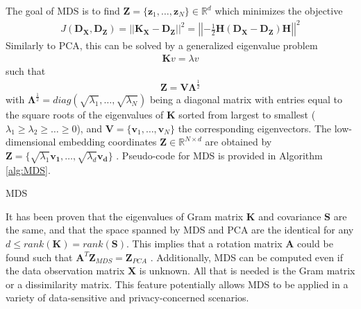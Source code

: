 The goal of MDS is to find $\bm{Z}= \{\bm{z}_{1}, \dots, \bm{z}_{N}\} \in \mathbb{R}^{d}$ which minimizes the objective 
\begin{align}
	J(\bm{D}_{\bm{X}},\bm{D}_{\bm{Z}}) = ||\bm{K}_{\bm{X}} - \bm{D}_{\bm{Z}} ||^{2} = \left |\left|-\frac{1}{2} \bm{H} (\bm{D}_{\bm{X}} - \bm{D}_{\bm{Z}}) \bm{H} \right |\right|^{2}
\end{align}
Similarly to PCA, this can be solved by a generalized eigenvalue problem 
\begin{align} \label{eq:MDS_eig}
	\bm{K}v = \lambda v
\end{align}
\noindent
such that 
\begin{align}
	\bm{Z} = \bm{V}\bm{\Lambda}^{\frac{1}{2}}
\end{align}
\noindent
with $\bm{\Lambda}^{\frac{1}{2}} = diag(\sqrt{\lambda_{1}},\dots,\sqrt{\lambda_N})$ being a diagonal matrix with entries equal to the square roots of the eigenvalues of $\bm{K}$ sorted from largest to smallest ($\lambda_{1} \geq  \lambda_{2} \geq \dots \geq 0$), and $\bm{V} = \{ \bm{v}_{1}, \dots, \bm{v}_{N} \}$ the corresponding eigenvectors.  The low-dimensional embedding coordinates $\bm{Z} \in \mathbb{R}^{N \times d}$ are obtained by $\bm{Z} = \{\sqrt{\lambda_{1}}\bm{v_{1}}, \dots, \sqrt{\lambda_{d}}\bm{v_{d}} \}$ \citep{Chao2019RecentAdvancesSupervisedDimRed}.  Pseudo-code for MDS is provided in Algorithm \ref{alg:MDS}.

\begin{algorithm}[H]
	\caption{MDS}
	\label{alg:MDS}
	\begin{algorithmic}[1]
	\end{algorithmic}
\end{algorithm}

It has been proven that the eigenvalues of Gram matrix $\bm{K}$ and covariance $\bm{S}$ are the same, and that the space spanned by MDS and PCA are the identical for any $d \leq rank(\bm{K}) = rank(\bm{S})$.  This implies that a rotation matrix $\bm{A}$ could be found such that $\bm{A}^{T}\bm{Z}_{MDS} = \bm{Z}_{PCA}$ \citep{Sorzano2014DRReview}.  Additionally, MDS can be computed even if the data observation matrix $\bm{X}$ is unknown.  All that is needed is the Gram matrix or a dissimilarity matrix.  This feature potentially allows MDS to be applied in a variety of data-sensitive and privacy-concerned scenarios. 

